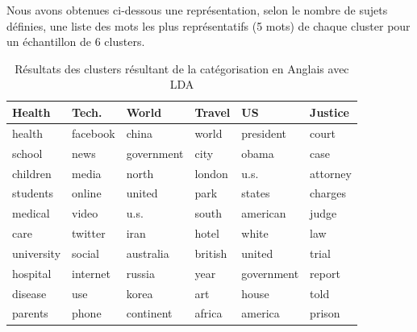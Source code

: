     Nous avons obtenues ci-dessous une représentation, selon le nombre de sujets définies, une liste des mots les plus représentatifs (5 mots) de chaque cluster pour un échantillon de 6 clusters.
    \begin{table}[H]
        \begin{center}
            \begin{tabular}{|C{2.1cm}|C{2.1cm}|C{2.1cm}|C{2.1cm}|C{2.1cm}|C{2.1cm}|}
                \hline                      
                \textbf{Health} & \textbf{Tech.} & \textbf{World} & \textbf{Travel} & \textbf{US} & \textbf{Justice}\\ 
                \hline     
                health &  facebook &         china  &    world  &     president   &   court \\
                school  &     news  &   government  &     city     &      obama  &     case \\
                children  &    media   &       north  &   london     &       u.s.  & attorney \\  
                students  &   online   &      united  &     park     &     states  &  charges \\  
                medical  &    video   &        u.s.  &    south     &   american  &    judge \\  
                care  &  twitter   &        iran  &    hotel     &      white  &      law \\  
                university  &   social   &      australia  &  british     &     united  & trial \\ 
                hospital &  internet   &      russia   &    year   &   government  &   report \\  
                disease   &     use   &       korea   &     art & house  &    told  \\  
                parents   &   phone & continent &   africa    &     america  &   prison \\  
                \hline
                
            \end{tabular}
        \end{center}
        \caption{Résultats des clusters résultant de la catégorisation en Anglais avec LDA}
        \label{Lda-categ}
    \end{table}                           

